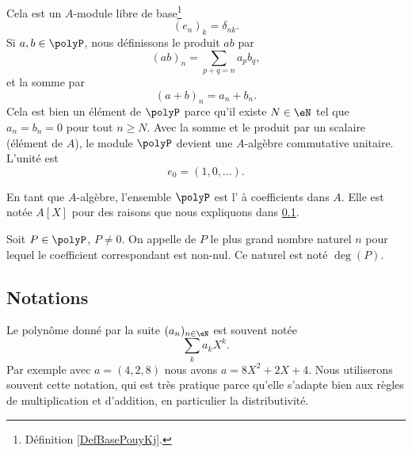 Cela est un \( A\)-module libre de base\footnote{Définition \ref{DefBasePouyKj}.}
\begin{equation}
    (e_n)_k=\delta_{nk}.
\end{equation}
Si \( a,b\in\polyP\), nous définissons le produit \( ab\) par
\begin{equation}
    (ab)_n=\sum_{p+q=n}a_pb_q,
\end{equation}
et la somme par
\begin{equation}
    (a+b)_n=a_n+b_n.
\end{equation}
Cela est bien un élément de \( \polyP\) parce qu'il existe \( N\in\eN\) tel que \( a_n=b_n=0\) pour tout \( n\geq N\). Avec la somme et le produit par un scalaire (élément de \( A\)), le module \( \polyP\) devient une \( A\)-algèbre commutative unitaire. L'unité est 
\begin{equation}
    e_0=(1,0,\ldots).
\end{equation}

\begin{definition}  \label{DefRGOooGIVzkx}
    En tant que \( A\)-algèbre, l'ensemble \( \polyP\) est l' à coefficients dans \( A\). Elle est notée \( A[X]\) pour des raisons que nous expliquons dans \ref{SUBSECooLEKVooFBPSJz}.
\end{definition}

\begin{definition}  \label{DefDegrePoly}
    Soit \( P \in \polyP\), \( P \neq 0 \). On appelle  de $P$ le plus grand nombre naturel $n$ pour lequel le coefficient correspondant est non-nul. Ce naturel est noté \( \deg(P) \).
\end{definition}

\subsection{Notations}
\label{SUBSECooLEKVooFBPSJz}

Le polynôme donné par la suite \( (a_n)_{n\in \eN}\) est souvent notée
\begin{equation}
    \sum_ka_kX^k.
\end{equation}
Par exemple avec \( a=(4,2,8)\) nous avons \( a=8X^2+2X+4\). Nous utiliserons souvent cette notation, qui est très pratique parce qu'elle s'adapte bien aux règles de multiplication et d'addition, en particulier la distributivité.

